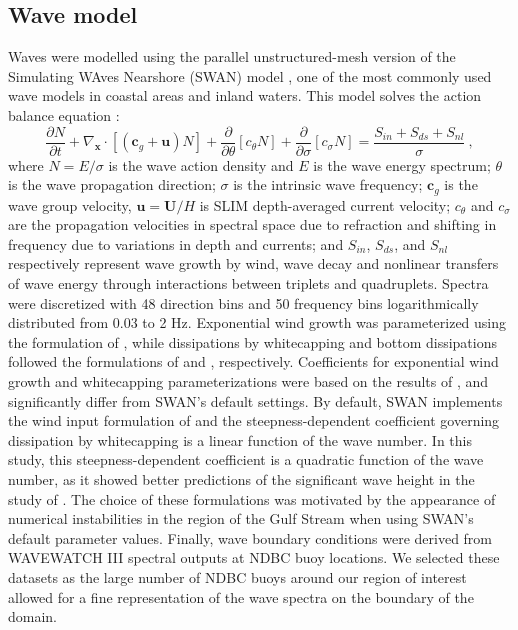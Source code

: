 \documentclass[preprint,12pt,authoryear]{elsarticle}
\begin{document}
\subsection{Wave model}
Waves were modelled using the parallel unstructured-mesh version of the Simulating WAves Nearshore (SWAN) model \citep{booij1999third}, one of the most commonly used wave models in coastal areas and inland waters. This model solves the action balance equation \citep{mei1989applied}:
\begin{equation}
    \dfrac{\partial N}{\partial t} + \nabla_\mathbf{x}\cdot[(\mathbf{c}_g+\mathbf{u})N] + \dfrac{\partial }{\partial \theta}[c_\theta N] + \dfrac{\partial}{\partial \sigma}[c_\sigma N] = \dfrac{S_{in}+S_{ds}+S_{nl}}{\sigma}~, \label{eq:swan}
\end{equation}
where $N=E/\sigma$ is the wave action density and $E$ is the wave energy spectrum; $\theta$ is the wave propagation direction; $\sigma$ is the intrinsic wave frequency; $\mathbf{c}_g$ is the wave group velocity, $\mathbf{u}=\mathbf{U}/H$ is SLIM depth-averaged current velocity; $c_\theta$ and $c_\sigma$ are the propagation velocities in spectral space due to refraction and shifting in frequency due to variations in depth and currents; and $S_{in}$, $S_{ds}$, and $S_{nl}$ respectively represent wave growth by wind, wave decay and nonlinear transfers of wave energy through interactions between triplets and quadruplets. Spectra were discretized with 48 direction bins and 50 frequency bins logarithmically distributed from 0.03 to 2 Hz. Exponential wind growth was parameterized using the formulation of \cite{janssen1991quasi}, while dissipations by whitecapping and bottom dissipations followed the formulations of \cite{komen1984existence} and \cite{madsen1989spectral}, respectively. Coefficients for exponential wind growth and whitecapping parameterizations were based on the results of \cite{siadatmousavi2011evaluation}, and significantly differ from SWAN's default settings. By default, SWAN implements the wind input formulation of \cite{komen1984existence} and the steepness-dependent coefficient governing dissipation by whitecapping is a linear function of the wave number. In this study, this steepness-dependent coefficient is a quadratic function of the wave number, as it showed better predictions of the significant wave height in the study of \cite{siadatmousavi2011evaluation}. The choice of these formulations was motivated by the appearance of numerical instabilities in the region of the Gulf Stream when using SWAN's default parameter values. Finally, wave boundary conditions were derived from WAVEWATCH III \citep{tolman2009user} spectral outputs at NDBC buoy locations. We selected these datasets as the large number of NDBC buoys around our region of interest allowed for a fine representation of the wave spectra on the boundary of the domain. 
\end{document}

